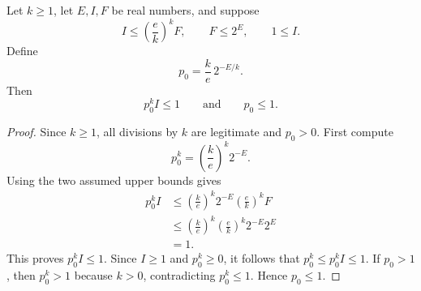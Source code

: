 \begin{helper}
Let \(k\ge1\), let \(E,I,F\) be real numbers, and suppose
\[
  I\le \left(\frac{e}{k}\right)^k F,\qquad
  F\le 2^E,\qquad
  1\le I.
\]
Define
\[
  p_0=\frac{k}{e}\,2^{-E/k}.
\]
Then
\[
  p_0^k I\le1
  \qquad\text{and}\qquad
  p_0\le1.
\]
\end{helper}
\begin{proof}
Since \(k\ge1\), all divisions by \(k\) are legitimate and \(p_0>0\).
First compute
\[
  p_0^k
  =
  \left(\frac{k}{e}\right)^k 2^{-E}.
\]
Using the two assumed upper bounds gives
\[
\begin{aligned}
  p_0^k I
  &\le
  \left(\frac{k}{e}\right)^k2^{-E}
  \left(\frac{e}{k}\right)^k F\\
  &\le
  \left(\frac{k}{e}\right)^k
  \left(\frac{e}{k}\right)^k
  2^{-E}2^E\\
  &=1.
\end{aligned}
\]
This proves \(p_0^k I\le1\).  Since \(I\ge1\) and \(p_0^k\ge0\), it follows
that \(p_0^k\le p_0^k I\le1\).  If \(p_0>1\), then \(p_0^k>1\) because
\(k>0\), contradicting \(p_0^k\le1\).  Hence \(p_0\le1\).
\end{proof}
